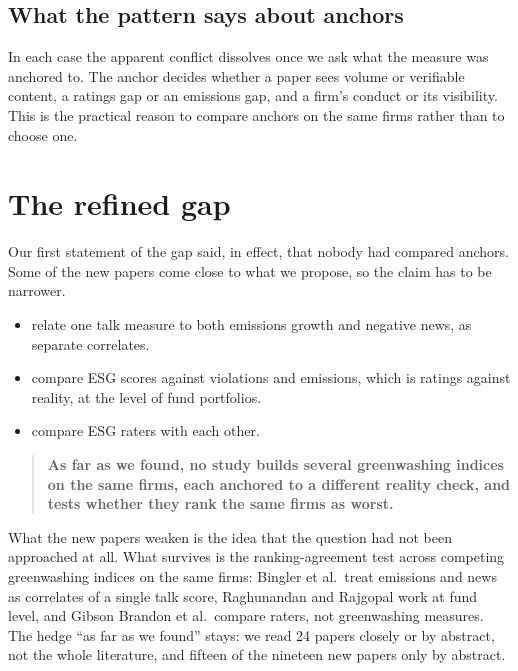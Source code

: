 \documentclass[12pt,a4paper]{article}
\begin{document}
\subsection{What the pattern says about anchors}

In each case the apparent conflict dissolves once we ask what the measure was anchored to. The
anchor decides whether a paper sees volume or verifiable content, a ratings gap or an emissions
gap, and a firm's conduct or its visibility. This is the practical reason to compare anchors on
the same firms rather than to choose one.

\section{The refined gap}
\label{sec:gap}

Our first statement of the gap said, in effect, that nobody had compared anchors. Some of the new
papers come close to what we propose, so the claim has to be narrower.

\begin{itemize}
\item \citet{bingler2024} relate one talk measure to both emissions growth and negative news, as
  separate correlates.
\item \citet{raghunandan2022} compare ESG scores against violations and emissions, which is
  ratings against reality, at the level of fund portfolios.
\item \citet{gibsonbrandon2021} compare ESG raters with each other.
\end{itemize}

\begin{quote}
\textbf{As far as we found, no study builds several greenwashing indices on the same firms, each
anchored to a different reality check, and tests whether they rank the same firms as worst.}
\end{quote}

What the new papers weaken is the idea that the question had not been approached at all. What
survives is the ranking-agreement test across competing greenwashing indices on the same firms:
Bingler et al.\ treat emissions and news as correlates of a single talk score, Raghunandan and
Rajgopal work at fund level, and Gibson Brandon et al.\ compare raters, not greenwashing measures.
The hedge ``as far as we found'' stays: we read 24 papers closely or by abstract, not the whole
literature, and fifteen of the nineteen new papers only by abstract.
\end{document}
